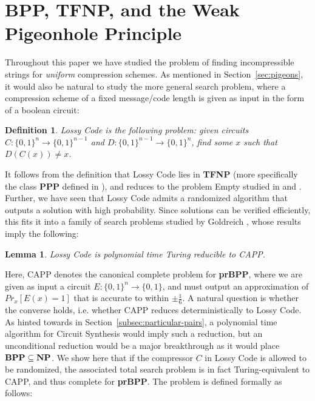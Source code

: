 \documentclass[11pt]{article}
\newtheorem{lemma}{Lemma}
\newtheorem{definition}{Definition}
\newcommand{\B}{\{0,1\}}
\def\cl{\bf}
\begin{document}
\section{BPP, TFNP, and the Weak Pigeonhole Principle}\label{sec:bpp}
Throughout this paper we have studied the problem of finding incompressible strings for \emph{uniform} compression schemes. As mentioned in Section~\ref{sec:pigeons}, it would also be natural to study the more general search problem, where a compression scheme of a fixed message/code length is given as input in the form of a boolean circuit:
\begin{definition}
{\sc Lossy Code} is the following problem: given circuits $C\colon \B^n \rightarrow \B^{n-1}$ and $D\colon \B^{n-1} \rightarrow \B^n$, find some $x$ such that $D(C(x)) \neq x$.
\end{definition}
It follows from the definition that {\sc Lossy Code} lies in {\cl TFNP} (more specifically the class {\cl PPP} defined in \cite{christos}), and reduces to the problem {\sc Empty} studied in \cite{total} and \cite{Korten}. Further, we have seen that {\sc Lossy Code} admits a randomized algorithm that outputs a solution with high probability. Since solutions can be verified efficiently, this fits it into a family of search problems studied by Goldreich \cite{Goldreich}, whose results imply the following:
\begin{lemma}
{\sc Lossy Code} is polynomial time Turing reducible to {\sc CAPP}.
\end{lemma}

Here, {\sc CAPP} denotes the canonical complete problem for {\cl prBPP}, where we are given as input a circuit $E\colon \B^n \to \B$, and must output an approximation of $Pr_x[E(x)=1]$ that is accurate to within $\pm \frac{1}{6}$.
A natural question is whether the converse holds, i.e. whether {\sc CAPP} reduces deterministically to {\sc Lossy Code}. As hinted towards in Section~\ref{subsec:particular-pairs}, a polynomial time algorithm for {\sc Circuit Synthesis} would imply such a reduction, but an unconditional reduction would be a major breakthrough as it would place ${\cl BPP} \subseteq {\cl NP}$. We show here that if the compressor $C$ in {\sc Lossy Code} is allowed to be randomized, the associated total search problem is in fact Turing-equivalent to {\sc CAPP}, and thus complete for {\cl prBPP}. The problem is defined formally as follows:
\end{document}
